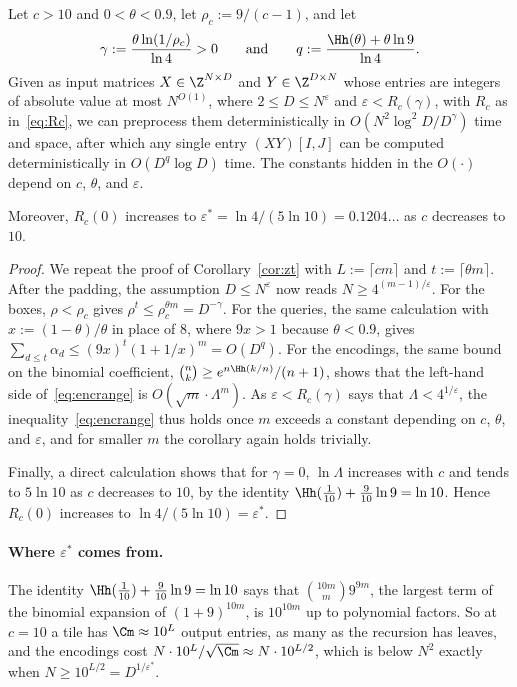 \begin{corollary}\label{cor:tradeoff}
Let $c>10$ and $0<\theta<0.9$, let $\rho_c:=9/(c-1)$, and let
\[
\gamma:=\frac{\theta\ln(1/\rho_c)}{\ln4}>0\qquad\text{and}\qquad q:=\frac{\Hh(\theta)+\theta\ln9}{\ln4} .
\]
Given as input matrices $X\in\Z^{N\times D}$ and $Y\in\Z^{D\times N}$ whose entries are integers of absolute value at most $N^{O(1)}$, where $2\le D\le N^{\varepsilon}$ and $\varepsilon<R_c(\gamma)$, with $R_c$ as in~\eqref{eq:Rc}, we can preprocess them deterministically in $O(N^2\log^2\!D/D^{\gamma})$ time and space, after which any single entry $(XY)[I,J]$ can be computed deterministically in $O(D^{q}\log D)$ time. The constants hidden in the $O(\cdot)$ depend on $c$, $\theta$, and $\varepsilon$.

Moreover, $R_c(0)$ increases to $\varepsilon^*=\ln4/(5\ln10)=0.1204\ldots$ as $c$ decreases to $10$.
\end{corollary}


\begin{proof}
We repeat the proof of Corollary~\ref{cor:zt} with $L:=\lceil cm\rceil$ and $t:=\lceil\theta m\rceil$. After the padding, the assumption $D\le N^{\varepsilon}$ now reads $N\ge4^{(m-1)/\varepsilon}$. For the boxes, $\rho<\rho_c$ gives $\rho^t\le\rho_c^{\theta m}=D^{-\gamma}$. For the queries, the same calculation with $x:=(1-\theta)/\theta$ in place of $8$, where $9x>1$ because $\theta<0.9$, gives $\sum_{d\le t}\alpha_d\le(9x)^t(1+1/x)^m=O(D^{q})$. For the encodings, the same bound on the binomial coefficient, $\binom nk\ge e^{n\Hh(k/n)}/(n+1)$, shows that the left-hand side of~\eqref{eq:encrange} is $O(\sqrt m\cdot\Lambda^m)$. As $\varepsilon<R_c(\gamma)$ says that $\Lambda<4^{1/\varepsilon}$, the inequality~\eqref{eq:encrange} thus holds once $m$ exceeds a constant depending on $c$, $\theta$, and $\varepsilon$, and for smaller $m$ the corollary again holds trivially.

Finally, a direct calculation shows that for $\gamma=0$, $\ln\Lambda$ increases with $c$ and tends to $5\ln10$ as $c$ decreases to $10$, by the identity $\Hh(\frac1{10})+\frac9{10}\ln9=\ln10$. Hence $R_c(0)$ increases to $\ln4/(5\ln10)=\varepsilon^*$.
\end{proof}

\paragraph{Where $\varepsilon^*$ comes from.}
The identity $\Hh(\frac1{10})+\frac9{10}\ln9=\ln10$ says that $\binom{10m}m9^{9m}$, the largest term of the binomial expansion of $(1+9)^{10m}$, is $10^{10m}$ up to polynomial factors. So at $c=10$ a tile has $\Cm\approx10^L$ output entries, as many as the recursion has leaves, and the encodings cost $N\cdot10^L/\sqrt{\Cm}\approx N\cdot10^{L/2}$, which is below $N^2$ exactly when $N\ge10^{L/2}=D^{1/\varepsilon^*}$.

